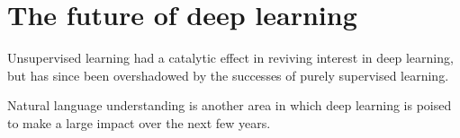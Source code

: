 \documentclass[10pt,twocolumn,letterpaper]{article}
\begin{document}
	\section*{The future of deep learning}
	Unsupervised learning had a catalytic effect in reviving interest in deep learning, but has since been overshadowed by the successes of purely supervised learning.
	\par
	Natural language understanding is another area in which deep learning is poised to make a large impact over the next few years.
	{\small
		
		
	}
\end{document}
